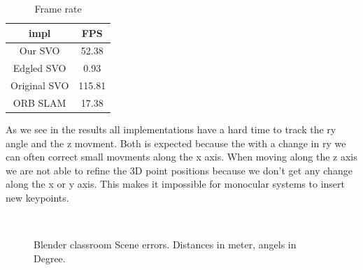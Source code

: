 \documentclass[11pt,a4paper,titlepage,oneside]{report}
\begin{document}
\begin{table}[H]
  \centering
  \begin{tabular}{|c|c|}
  impl & FPS\\
  \hline
  Our SVO & 52.38\\
  Edgled SVO & 0.93\\
  Original SVO & 115.81\\
  ORB SLAM & 17.38
\end{tabular}
\caption{Frame rate}
\label{tab:fps}
\end{table}

As we see in the results all implementations have a hard time to track the ry angle and the z movment. Both is expected because the with a change in ry we can often correct small movments along the x axis. When moving along the z axis we are not able to refine the 3D point positions because we don't get any change along the x or y axis. This makes it impossible for monocular systems to insert new keypoints.

\begin{figure}[H]
  \\
  \caption{Blender classroom Scene errors. Distances in meter, angels in Degree.}\label{fig:blender_classroom_simple_diff}
\end{figure}
\end{document}

